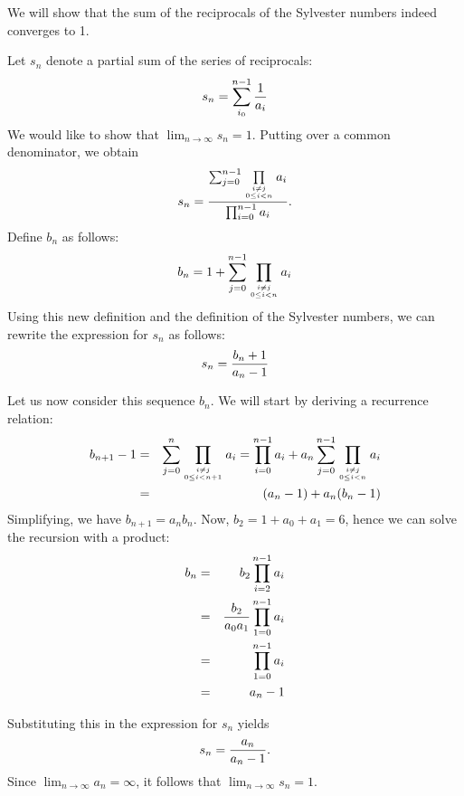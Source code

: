\documentclass[12pt]{article}
\begin{document}
We will show that the sum of the reciprocals of the Sylvester numbers indeed
converges to 1.  

Let $s_n$ denote a partial sum of the series of reciprocals: 
\[ s_n = \sum_{i_0}^{n-1} {1 \over a_i} \] 
We would like to show that $\lim_{n \to \infty} s_n = 1$.  Putting
over a common denominator, we obtain 
\[s_n = {\sum_{j=0}^{n-1} \prod\limits_{i \neq j \atop 0 \le i < n}
a_i \over \prod_{i=0}^{n-1} a_i}. \]
Define $b_n$ as follows:
\[ b_n = 1 + \sum_{j=0}^{n-1} \prod_{i \neq j \atop 0 \le i < n} a_i
\]
Using this new definition and the definition of the Sylvester numbers,
we can rewrite the expression for $s_n$ as follows:
\[ s_n = {b_n + 1 \over a_n - 1}\]

Let us now consider this sequence $b_n$.  We will start by deriving a
recurrence relation:
\begin{eqnarray*}
b_{n+1} - 1 &=&  \sum_{j=0}^n \prod_{i \neq j \atop 0 \le i < n+1} a_i =
\prod_{i=0}^{n-1} a_i + a_n \sum_{j=0}^{n-1} \prod_{i \neq j \atop 0 \le
i < n} a_i \\
&=& (a_n - 1) + a_n (b_n - 1) \\
\end{eqnarray*}
Simplifying, we have $b_{n+1} = a_n b_n$.  Now, $b_2 = 1 + a_0 + a_1 =
6$, hence we can solve the recursion with a product:
\begin{eqnarray*}
b_n &=& b_2 \prod_{i=2}^{n-1} a_i \\
&=& {b_2 \over a_0 a_1} \prod_{1=0}^{n-1} a_i \\
&=& \prod_{1=0}^{n-1} a_i \\
&=& a_n - 1
\end{eqnarray*}

Substituting this in the expression for $s_n$ yields
\[ s_n = {a_n \over a_n - 1}. \]
Since $\lim_{n \to \infty} a_n = \infty$,
it follows that $\lim_{n \to \infty} s_n = 1$.
\end{document}
